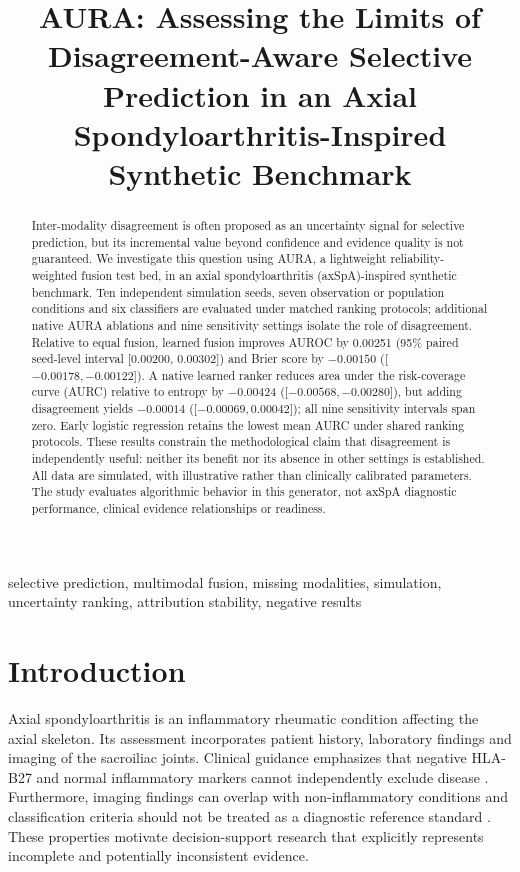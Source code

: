 \documentclass[conference]{IEEEtran}
\title{AURA: Assessing the Limits of Disagreement-Aware Selective Prediction in an Axial Spondyloarthritis-Inspired Synthetic Benchmark}
\author{\IEEEauthorblockN{Anonymous author(s)}\IEEEauthorblockA{Author details withheld for review}}
\begin{document}
\maketitle
\begin{abstract}
Inter-modality disagreement is often proposed as an uncertainty signal for selective prediction, but its incremental value beyond confidence and evidence quality is not guaranteed. We investigate this question using AURA, a lightweight reliability-weighted fusion test bed, in an axial spondyloarthritis (axSpA)-inspired synthetic benchmark. Ten independent simulation seeds, seven observation or population conditions and six classifiers are evaluated under matched ranking protocols; additional native AURA ablations and nine sensitivity settings isolate the role of disagreement. Relative to equal fusion, learned fusion improves AUROC by 0.00251 (95\% paired seed-level interval [0.00200, 0.00302]) and Brier score by $-0.00150$ ([$-0.00178,-0.00122$]). A native learned ranker reduces area under the risk-coverage curve (AURC) relative to entropy by $-0.00424$ ([$-0.00568,-0.00280$]), but adding disagreement yields $-0.00014$ ([$-0.00069,0.00042$]); all nine sensitivity intervals span zero. Early logistic regression retains the lowest mean AURC under shared ranking protocols. These results constrain the methodological claim that disagreement is independently useful: neither its benefit nor its absence in other settings is established. All data are simulated, with illustrative rather than clinically calibrated parameters. The study evaluates algorithmic behavior in this generator, not axSpA diagnostic performance, clinical evidence relationships or readiness.
\end{abstract}
\begin{IEEEkeywords}
selective prediction, multimodal fusion, missing modalities, simulation, uncertainty ranking, attribution stability, negative results
\end{IEEEkeywords}
\section{Introduction}
Axial spondyloarthritis is an inflammatory rheumatic condition affecting the axial skeleton. Its assessment incorporates patient history, laboratory findings and imaging of the sacroiliac joints. Clinical guidance emphasizes that negative HLA-B27 and normal inflammatory markers cannot independently exclude disease \cite{nice}. Furthermore, imaging findings can overlap with non-inflammatory conditions and classification criteria should not be treated as a diagnostic reference standard \cite{mri,asas}. These properties motivate decision-support research that explicitly represents incomplete and potentially inconsistent evidence.
\end{document}
